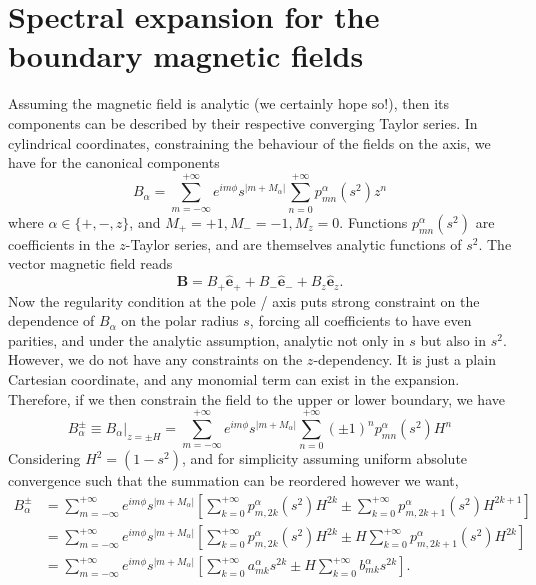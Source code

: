 \newpage
\section{Spectral expansion for the boundary magnetic fields}

Assuming the magnetic field is analytic (we certainly hope so!), then its components can be described by their respective converging Taylor series. In cylindrical coordinates, constraining the behaviour of the fields on the axis, we have for the canonical components
%
\begin{equation}
    B_\alpha = \sum_{m=-\infty}^{+\infty} e^{im\phi} s^{|m+M_\alpha|} \sum_{n=0}^{+\infty} p^\alpha_{mn}(s^2) z^n
\end{equation}
%
where $\alpha \in \{+, -, z\}$, and $M_+ = +1, M_- = -1, M_z = 0$. Functions $p^\alpha_{mn}(s^2)$ are coefficients in the $z$-Taylor series, and are themselves analytic functions of $s^2$. The vector magnetic field reads
%
\[
    \mathbf{B} = B_+ \hat{\mathbf{e}}_+ + B_- \hat{\mathbf{e}}_- + B_z \hat{\mathbf{e}}_z.
\]
%
Now the regularity condition at the pole / axis puts strong constraint on the dependence of $B_\alpha$ on the polar radius $s$, forcing all coefficients to have even parities, and under the analytic assumption, analytic not only in $s$ but also in $s^2$. However, we do not have any constraints on the $z$-dependency. It is just a plain Cartesian coordinate, and any monomial term can exist in the expansion. Therefore, if we then constrain the field to the upper or lower boundary, we have
%
\begin{equation}
    B_\alpha^{\pm} \equiv B_\alpha|_{z=\pm H} = \sum_{m=-\infty}^{+\infty} e^{im\phi} s^{|m+M_\alpha|} \sum_{n=0}^{+\infty} (\pm 1)^n p^\alpha_{mn}(s^2) H^n
\end{equation}
%
Considering $H^2 = (1 - s^2)$, and for simplicity assuming uniform absolute convergence such that the summation can be reordered however we want,
%
\begin{equation}
\begin{aligned}
    B_\alpha^{\pm} &= \sum_{m=-\infty}^{+\infty} e^{im\phi} s^{|m+M_\alpha|} \left[\sum_{k=0}^{+\infty} p^\alpha_{m,2k}(s^2) H^{2k} \pm \sum_{k=0}^{+\infty} p_{m, 2k+1}^\alpha (s^2) H^{2k+1} \right] \\ 
    &= \sum_{m=-\infty}^{+\infty} e^{im\phi} s^{|m+M_\alpha|} \left[\sum_{k=0}^{+\infty} p^\alpha_{m,2k}(s^2) H^{2k} \pm H \sum_{k=0}^{+\infty} p_{m, 2k+1}^\alpha (s^2) H^{2k} \right] \\ 
    &= \sum_{m=-\infty}^{+\infty} e^{im\phi} s^{|m+M_\alpha|} \left[\sum_{k=0}^{+\infty} a^\alpha_{mk} s^{2k} \pm H \sum_{k=0}^{+\infty} b_{mk}^\alpha s^{2k} \right].
\end{aligned}
\end{equation}
